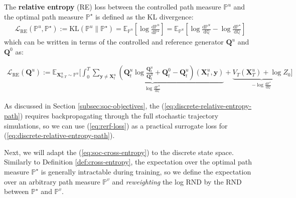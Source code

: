 \documentclass{article}
\begin{document}
\begin{definition}\label{def:discrete-relative-entropy}
    The \textbf{relative entropy} (RE) loss between the controlled path measure $\mathbb{P}^u$ and the optimal path measure $\mathbb{P}^\star$ is defined as the KL divergence:
    \begin{align}
        \mathcal{L}_{\text{RE}}(\mathbb{P}^u, \mathbb{P}^\star):=\text{KL}(\mathbb{P}^u\|\mathbb{P}^\star)=\mathbb{E}_{\mathbb{P}^u}\left[\log \frac{\mathrm{d}\mathbb{P}^u}{\mathrm{d}\mathbb{P}^\star}\right]=\mathbb{E}_{\mathbb{P}^u}\left[\log \frac{\mathrm{d}\mathbb{P}^u}{\mathrm{d}\mathbb{Q}}-\log \frac{\mathrm{d}\mathbb{P}^\star}{\mathrm{d}\mathbb{Q}}\right]\tag{Discrete RE Objective}\label{eq:discrete-relative-entropy-path}
    \end{align}
    which can be written in terms of the controlled and reference generator $\boldsymbol{Q}^u$ and $\boldsymbol{Q}^0$ as:
    \begin{small}
    \begin{align}
        \mathcal{L}_{\text{RE}}(\boldsymbol{Q}^u):=\mathbb{E}_{\boldsymbol{X}^u_{0:T}\sim \mathbb{P}^u}\bigg[\underbrace{\int_0^T\sum_{\boldsymbol{y}\neq \boldsymbol{X}^u_t}\left(\boldsymbol{Q}_t^u\log \frac{\boldsymbol{Q}^u_t}{\boldsymbol{Q}^0_t}+\boldsymbol{Q}_t^0-\boldsymbol{Q}_t^u\right)(\boldsymbol{X}^u_t,\boldsymbol{y})}_{\log \frac{\mathrm{d}\mathbb{P}^u}{\mathrm{d}\mathbb{Q}}}+\underbrace{V_T(\boldsymbol{X}^u_T)+\log Z_0}_{-\log \frac{\mathrm{d}\mathbb{P}^\star}{\mathrm{d}\mathbb{Q}}}\bigg]\tag{Discrete RE Loss}\label{eq:relative-entropy-discrete}
    \end{align}
    \end{small}
\end{definition}

As discussed in Section \ref{subsec:soc-objectives}, the (\ref{eq:discrete-relative-entropy-path}) requires backpropagating through the full stochastic trajectory simulations, so we can use (\ref{eq:rerf-loss}) as a practical surrogate loss for (\ref{eq:discrete-relative-entropy-path}).

Next, we will adapt the (\ref{eq:soc-cross-entropy}) to the discrete state space. Similarly to Definition \ref{def:cross-entropy}, the expectation over the optimal path measure $\mathbb{P}^\star$ is generally intractable during training, so we define the expectation over an arbitrary path measure $\mathbb{P}^v$ and \textit{reweighting} the log RND by the RND between $\mathbb{P}^\star$ and $\mathbb{P}^v$.
\end{document}
